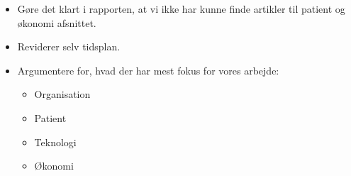 \begin{itemize}
\item Gøre det klart i rapporten, at vi ikke har kunne finde artikler til patient og økonomi afsnittet. 
\item Reviderer selv tidsplan.
\item Argumentere for, hvad der har mest fokus for vores arbejde:
\begin{itemize}
\item Organisation
\item Patient
\item Teknologi
\item Økonomi
\end{itemize}
\end{itemize}

\newpage


